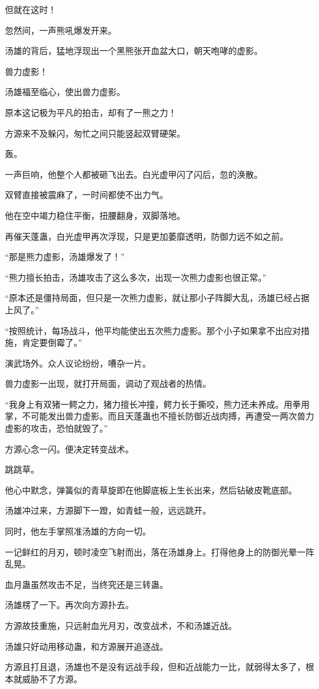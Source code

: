 \begin{this_body}
但就在这时！

忽然间，一声熊吼爆发开来。

汤雄的背后，猛地浮现出一个黑熊张开血盆大口，朝天咆哮的虚影。

兽力虚影！

汤雄福至临心，使出兽力虚影。

原本这记极为平凡的拍击，却有了一熊之力！

方源来不及躲闪，匆忙之间只能竖起双臂硬架。

轰。

一声巨响，他整个人都被砸飞出去。白光虚甲闪了闪后，忽的涣散。

双臂直接被震麻了，一时间都使不出力气。

他在空中竭力稳住平衡，扭腰翻身，双脚落地。

再催天蓬蛊，白光虚甲再次浮现，只是更加萎靡透明，防御力远不如之前。

“那是熊力虚影，汤雄爆发了！”

“熊力擅长拍击，汤雄攻击了这么多次，出现一次熊力虚影也很正常。”

“原本还是僵持局面，但只是一次熊力虚影，就让那小子阵脚大乱，汤雄已经占据上风了。”

“按照统计，每场战斗，他平均能使出五次熊力虚影。那个小子如果拿不出应对措施，肯定要倒霉了。”

演武场外。众人议论纷纷，嘈杂一片。

兽力虚影一出现，就打开局面，调动了观战者的热情。

“我身上有双猪一鳄之力，猪力擅长冲撞，鳄力长于撕咬，熊力还未养成。用拳用掌，不可能发出兽力虚影。而且天蓬蛊也不擅长防御近战肉搏，再遭受一两次兽力虚影的攻击，恐怕就毁了。”

方源心念一闪。便决定转变战术。

跳跳草。

他心中默念，弹簧似的青草旋即在他脚底板上生长出来，然后钻破皮靴底部。

汤雄冲过来，方源脚下一蹬，如青蛙一般，远远跳开。

同时，他左手掌照准汤雄的方向一切。

一记鲜红的月刃，顿时凌空飞射而出，落在汤雄身上。打得他身上的防御光晕一阵乱晃。

血月蛊虽然攻击不足，当终究还是三转蛊。

汤雄楞了一下。再次向方源扑去。

方源故技重施，只远射血光月刃，改变战术，不和汤雄近战。

汤雄只好动用移动蛊，和方源展开追逐战。

方源且打且退，汤雄也不是没有远战手段，但和近战能力一比，就弱得太多了，根本就威胁不了方源。


\end{this_body}
